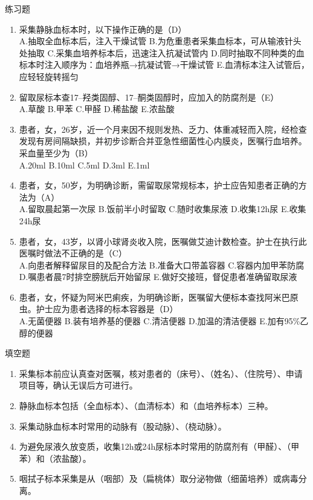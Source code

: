 \documentclass[11pt, a4paper]{ctexart}
\begin{document}
\begin{examplebox}{练习题}
\begin{enumerate}
    \item 采集静脉血标本时，以下操作正确的是（D）\\
    A.抽取全血标本后，注入干燥试管 \quad B.为危重患者采集血标本，可从输液针头处抽取 \quad C.采集血培养标本后，迅速注入抗凝试管内 \quad D.同时抽取不同种类的血标本时注入顺序为：血培养瓶→抗凝试管→干燥试管 \quad E.血清标本注入试管后，应轻轻旋转摇匀
    \item 留取尿标本查17–羟类固醇、17–酮类固醇时，应加入的防腐剂是（E）\\
    A.草酸 \quad B.甲苯 \quad C.甲醛 \quad D.稀盐酸 \quad E.浓盐酸
    \item 患者，女，26岁，近一个月来因不规则发热、乏力、体重减轻而入院，经检查发现有房间隔缺损，并初步诊断合并亚急性细菌性心内膜炎，医嘱行血培养。采血量至少为（B）\\
    A.20ml \quad B.10ml \quad C.5ml \quad D.3ml \quad E.1ml
    \item 患者，女，50岁，为明确诊断，需留取尿常规标本，护士应告知患者正确的方法为（A）\\
    A.留取晨起第一次尿 \quad B.饭前半小时留取 \quad C.随时收集尿液 \quad D.收集12h尿 \quad E.收集24h尿
    \item 患者，女，43岁，以肾小球肾炎收入院，医嘱做艾迪计数检查。护士在执行此医嘱时做法不正确的是（C）\\
    A.向患者解释留尿目的及配合方法 \quad B.准备大口带盖容器 \quad C.容器内加甲苯防腐 \quad D.嘱患者晨7时排空膀胱后开始留尿 \quad E.做好交接班，督促患者准确留取尿液
    \item 患者，女，怀疑为阿米巴痢疾，为明确诊断，医嘱留大便标本查找阿米巴原虫。护士应为患者选择的标本容器是（D）\\
    A.无菌便器 \quad B.装有培养基的便器 \quad C.清洁便器 \quad D.加温的清洁便器 \quad E.加有95\%乙醇的便器
\end{enumerate}
\end{examplebox}

\begin{tipsbox}{填空题}
\begin{enumerate}
    \item 采集标本前应认真查对医嘱，核对患者的（床号）、（姓名）、（住院号）、申请项目等，确认无误后方可进行。
    \item 静脉血标本包括（全血标本）、（血清标本）和（血培养标本）三种。
    \item 采集动脉血标本时常用的动脉有（股动脉）、（桡动脉）。
    \item 为避免尿液久放变质，收集12h或24h尿标本时常用的防腐剂有（甲醛）、（甲苯）和（浓盐酸）。
    \item 咽拭子标本采集是从（咽部）及（扁桃体）取分泌物做（细菌培养）或病毒分离。
\end{enumerate}
\end{tipsbox}
\end{document}
